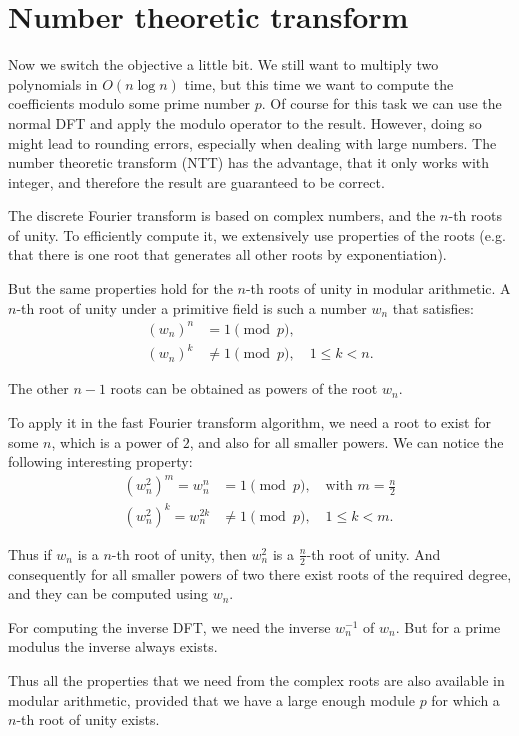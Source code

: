 \documentclass{article}
\begin{document}
\section{Number theoretic transform}

Now we switch the objective a little bit. We still want to multiply two polynomials in $O(n \log n)$ time, but this time we want to compute the coefficients modulo some prime number $p$. Of course for this task we can use the normal DFT and apply the modulo operator to the result. However, doing so might lead to rounding errors, especially when dealing with large numbers. The number theoretic transform (NTT) has the advantage, that it only works with integer, and therefore the result are guaranteed to be correct.

The discrete Fourier transform is based on complex numbers, and the $n$-th roots of unity. To efficiently compute it, we extensively use properties of the roots (e.g. that there is one root that generates all other roots by exponentiation).

But the same properties hold for the $n$-th roots of unity in modular arithmetic. A $n$-th root of unity under a primitive field is such a number $w_n$ that satisfies:
$$\begin{align} (w_n)^n &= 1 \pmod{p}, \\ (w_n)^k &\ne 1 \pmod{p}, \quad 1 \le k < n. \end{align}$$

The other $n-1$ roots can be obtained as powers of the root $w_n$.

To apply it in the fast Fourier transform algorithm, we need a root to exist for some $n$, which is a power of $2$, and also for all smaller powers. We can notice the following interesting property:
$$\begin{align} (w_n^2)^m = w_n^n &= 1 \pmod{p}, \quad \text{with } m = \frac{n}{2}\\ (w_n^2)^k = w_n^{2k} &\ne 1 \pmod{p}, \quad 1 \le k < m. \end{align}$$

Thus if $w_n$ is a $n$-th root of unity, then $w_n^2$ is a $\frac{n}{2}$-th root of unity. And consequently for all smaller powers of two there exist roots of the required degree, and they can be computed using $w_n$.

For computing the inverse DFT, we need the inverse $w_n^{-1}$ of $w_n$. But for a prime modulus the inverse always exists.

Thus all the properties that we need from the complex roots are also available in modular arithmetic, provided that we have a large enough module $p$ for which a $n$-th root of unity exists.
\end{document}
